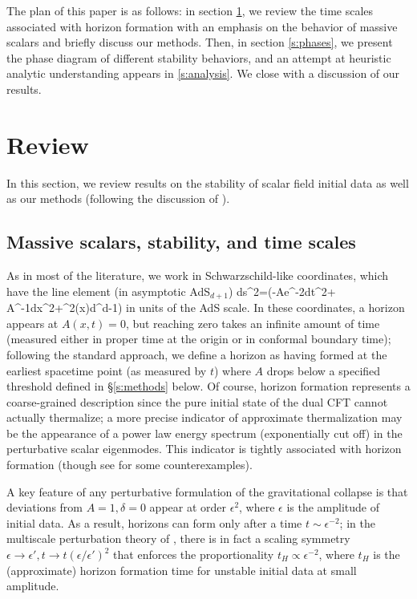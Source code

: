 \documentclass[../PhD.tex]{subfiles}
\begin{document}
The plan of this paper is as follows: in section \ref{s:review}, we review
the time scales associated with horizon formation with an emphasis on
the behavior of massive scalars and briefly discuss our methods.  Then,
in section \ref{s:phases}, we present the phase diagram of different
stability behaviors, and an attempt at heuristic analytic understanding 
appears in \ref{s:analysis}.
We close with a discussion of our results.


\section{Review}\label{s:review}
In this section, we review results on the stability of scalar field initial
data as well as our methods (following the discussion of \cite{1508.02709}).

\subsection{Massive scalars, stability, and time scales}

As in most of the literature, we work in Schwarzschild-like coordinates,
which have the line element (in asymptotic AdS$_{d+1}$)
  ds^2=\left(-Ae^{-2\delta}dt^2+
  A^{-1}dx^2+\sin^2(x)d\Omega^{d-1}\right)
\eeq
in units of the AdS scale.  In these coordinates, a horizon appears at
$A(x,t)=0$, but reaching zero takes an infinite amount of time (measured either
in proper time at the origin or in conformal boundary time); following
the standard approach, we define a horizon as having formed at the earliest
spacetime point (as measured by $t$) where $A$ drops below a specified
threshold defined in \S\ref{s:methods} below.  Of course, horizon formation
represents a coarse-grained description since the pure initial state of
the dual CFT cannot actually thermalize; a more precise indicator of
approximate thermalization may be the appearance of a power law energy spectrum
(exponentially cut off) in the perturbative scalar eigenmodes.  This
indicator is tightly associated with horizon formation (though see
\cite{1608.05402,1410.1869} for some counterexamples).  

A key feature of any perturbative formulation of the gravitational
collapse is that deviations from $A=1,\delta=0$ appear at order $\epsilon^2$,
where $\epsilon$ is the amplitude of initial data.  As a result,
horizons can form only after a time $t\sim\epsilon^{-2}$; in the
multiscale perturbation theory of \cite{1403.6471,1407.6273,1410.1880,1412.4761,1412.3249,1507.02684,1507.08261,1508.04943,1508.05474,1510.07836},
there is in fact a scaling symmetry
$\epsilon\to\epsilon',t\to t(\epsilon/\epsilon')^2$ that enforces the
proportionality $t_H\propto \epsilon^{-2}$, where $t_H$ is the (approximate)
horizon formation time for unstable initial data at small amplitude.
\end{document}
